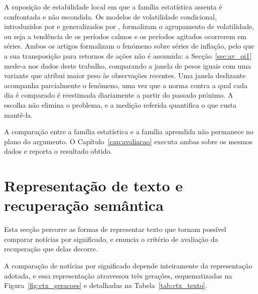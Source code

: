A suposição de estabilidade local em que a família estatística assenta é confrontada e não
escondida. Os modelos de volatilidade condicional, introduzidos por \textcite{engle1982arch} e
generalizados por \textcite{bollerslev1986garch}, formalizam o agrupamento de volatilidade, ou seja
a tendência de os períodos calmos e os períodos agitados ocorrerem em séries. Ambos os artigos
formalizam o fenómeno sobre séries de inflação, pelo que a sua transposição para retornos de ações
não é assumida: a Secção~\ref{sec:av_qi1} mede-a nos dados deste trabalho, comparando a janela de
pesos iguais com uma variante que atribui maior peso às observações recentes. Uma janela deslizante
acompanha parcialmente o fenómeno, uma vez que a norma contra a qual cada dia é comparado é
reestimada diariamente a partir do passado próximo. A escolha não elimina o problema, e a medição
referida quantifica o que custa mantê-la.

A comparação entre a família estatística e a família aprendida não permanece no plano do argumento.
O Capítulo~\ref{cap:avaliacao} executa ambas sobre os mesmos dados e reporta o resultado obtido.

\section{Representação de texto e recuperação semântica}
\label{sec:ctx_texto}

Esta secção percorre as formas de representar texto que tornam possível comparar notícias por
significado, e enuncia o critério de avaliação da recuperação que delas decorre.

A comparação de notícias por significado depende inteiramente da representação adotada, e essa
representação atravessou três gerações, esquematizadas na Figura~\ref{fig:ctx_geracoes} e
detalhadas na Tabela~\ref{tab:ctx_texto}.

